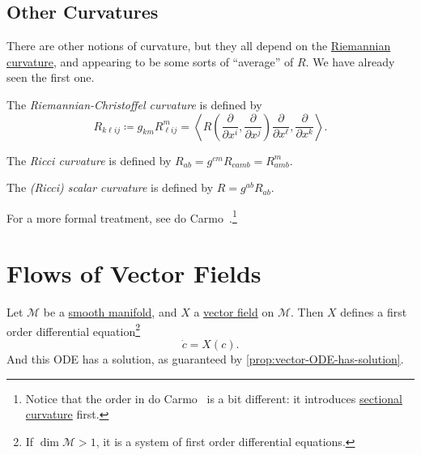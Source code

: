\subsection{Other Curvatures}
There are other notions of curvature, but they all depend on the \hyperref[def:Riemannian-curvature]{Riemannian curvature}, and appearing to be some sorts of ``average'' of \(R\). We have already seen the first one.

\begin{definition}\label{def:Riemannian-Christoffel-curvature}
	The \emph{Riemannian-Christoffel curvature}	is defined by
	\[
		R_{k \ell ij}
		\coloneqq g_{km} R^m_{\ell ij}
		= \left\langle R\left( \frac{\partial }{\partial x^i}, \frac{\partial }{\partial x^j} \right) \frac{\partial }{\partial x^{\ell } }, \frac{\partial }{\partial x^k} \right\rangle.
	\]
\end{definition}

\begin{definition}\label{def:Ricci-curvature}
	The \emph{Ricci curvature} is defined by \(R_{ab} = g^{cm}R_{c a m b} = R^m_{amb}\).
\end{definition}

\begin{definition}\label{def:Ricci-scalar-curvature}
	The \emph{(Ricci) scalar curvature} is defined by \(R = g^{ab}R_{ab}\).
\end{definition}

\begin{note}
	For a more formal treatment, see do Carmo~\cite[]{flaherty2013riemannian}.\footnote{Notice that the order in do Carmo~\cite{flaherty2013riemannian} is a bit different: it introduces \hyperref[def:sectional-curvature]{sectional curvature} first.}
\end{note}

\section{Flows of Vector Fields}
Let \(\mathcal{M} \) be a \hyperref[def:smooth-manifold]{smooth manifold}, and \(X\) a \hyperref[def:vector-field]{vector field} on \(\mathcal{M} \). Then \(X\) defines a first order differential equation\footnote{If \(\dim \mathcal{M} > 1\), it is a system of first order differential equations.}
\[
	\dot{c} = X(c).
\]
And this ODE has a solution, as guaranteed by \autoref{prop:vector-ODE-has-solution}.

